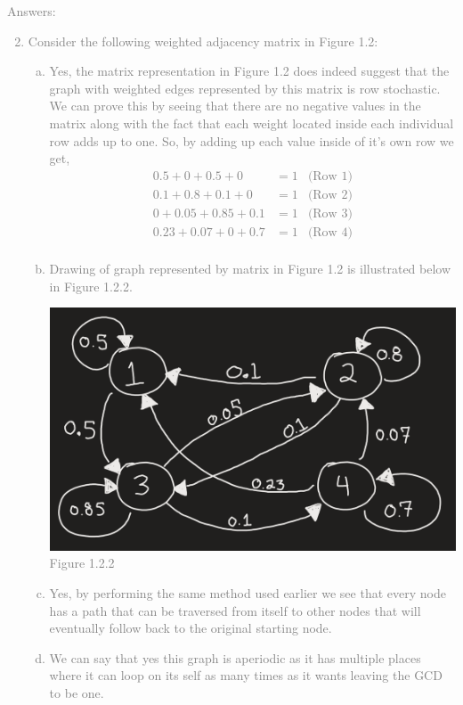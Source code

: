 \documentclass[11pt]{article}
\begin{document}
\textcolor{gray}{
Answers:
\begin{enumerate}
	\setcounter{enumi}{1}
	\item Consider the following weighted adjacency matrix in Figure 1.2:
	\begin{enumerate}[(a)]
			\item Yes, the matrix representation in Figure 1.2 does indeed suggest that the graph with weighted edges represented by this matrix is row stochastic.  We can prove this by seeing that there are no negative values in the matrix along with the fact that each weight located inside each individual row adds up to one. So, by adding up each value inside of it's own row we get,
\begin{align*}
	0.5 + 0 + 0.5 + 0  		&= 1		&\text{(Row 1)}\\
	0.1 + 0.8 + 0.1 + 0  	&= 1		&\text{(Row 2)}\\
	0 + 0.05 + 0.85 + 0.1  	&= 1		&\text{(Row 3)}\\
	0.23 + 0.07 + 0 + 0.7 	&= 1		&\text{(Row 4)}\\
\end{align*} 
			\item Drawing of graph represented by matrix in Figure 1.2	is illustrated below in Figure 1.2.2.\\
			\begin{center}
				\includegraphics[scale=0.6]{Question2PartB_Figure1.2.2}\\
				Figure 1.2.2
			\end{center}
			\item Yes, by performing the same method used earlier we see that every node has a path that can be traversed from itself to other nodes that will eventually follow back to the original starting node.
			\item We can say that yes this graph is aperiodic as it has multiple places where it can loop on its self as many times as it wants leaving the GCD to be one.
	\end{enumerate}
\end{enumerate}
}
\end{document}
